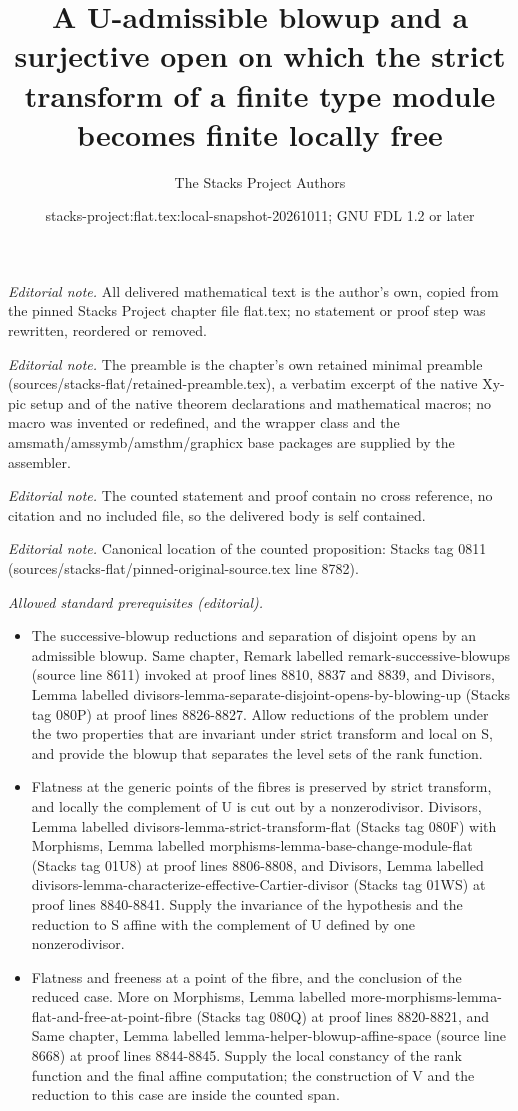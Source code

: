 \documentclass[10pt,a4paper]{amsart}
\title{A U-admissible blowup and a surjective open on which the strict transform of a finite type module becomes finite locally free}
\author{The Stacks Project Authors}
\date{stacks-project:flat.tex:local-snapshot-20261011; GNU FDL 1.2 or later}
\theoremstyle{plain}
\theoremstyle{definition}
\theoremstyle{remark}
\numberwithin{equation}{subsection}
\begin{document}
\maketitle
\noindent\textit{Editorial note.} All delivered mathematical text is the author's own, copied from the pinned Stacks Project chapter file flat.tex; no statement or proof step was rewritten, reordered or removed.\par\medskip
\noindent\textit{Editorial note.} The preamble is the chapter's own retained minimal preamble (sources/stacks-flat/retained-preamble.tex), a verbatim excerpt of the native Xy-pic setup and of the native theorem declarations and mathematical macros; no macro was invented or redefined, and the wrapper class and the amsmath/amssymb/amsthm/graphicx base packages are supplied by the assembler.\par\medskip
\noindent\textit{Editorial note.} The counted statement and proof contain no cross reference, no citation and no included file, so the delivered body is self contained.\par\medskip
\noindent\textit{Editorial note.} Canonical location of the counted proposition: Stacks tag 0811 (sources/stacks-flat/pinned-original-source.tex line 8782).\par\medskip
\noindent\textit{Allowed standard prerequisites (editorial).}\begin{itemize}
\item The successive-blowup reductions and separation of disjoint opens by an admissible blowup. Same chapter, Remark labelled remark-successive-blowups (source line 8611) invoked at proof lines 8810, 8837 and 8839, and Divisors, Lemma labelled divisors-lemma-separate-disjoint-opens-by-blowing-up (Stacks tag 080P) at proof lines 8826-8827. Allow reductions of the problem under the two properties that are invariant under strict transform and local on S, and provide the blowup that separates the level sets of the rank function.
\item Flatness at the generic points of the fibres is preserved by strict transform, and locally the complement of U is cut out by a nonzerodivisor. Divisors, Lemma labelled divisors-lemma-strict-transform-flat (Stacks tag 080F) with Morphisms, Lemma labelled morphisms-lemma-base-change-module-flat (Stacks tag 01U8) at proof lines 8806-8808, and Divisors, Lemma labelled divisors-lemma-characterize-effective-Cartier-divisor (Stacks tag 01WS) at proof lines 8840-8841. Supply the invariance of the hypothesis and the reduction to S affine with the complement of U defined by one nonzerodivisor.
\item Flatness and freeness at a point of the fibre, and the conclusion of the reduced case. More on Morphisms, Lemma labelled more-morphisms-lemma-flat-and-free-at-point-fibre (Stacks tag 080Q) at proof lines 8820-8821, and Same chapter, Lemma labelled lemma-helper-blowup-affine-space (source line 8668) at proof lines 8844-8845. Supply the local constancy of the rank function and the final affine computation; the construction of V and the reduction to this case are inside the counted span.
\end{itemize}\medskip
\end{document}
